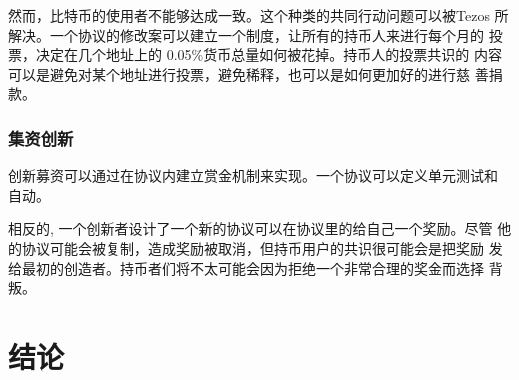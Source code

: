 \documentclass[letterpaper]{article}
\begin{document}
然而，比特币的使用者不能够达成一致。这个种类的共同行动问题可以被Tezos
所解决。一个协议的修改案可以建立一个制度，让所有的持币人来进行每个月的
投票，决定在几个地址上的 0.05\%货币总量如何被花掉。持币人的投票共识的
内容可以是避免对某个地址进行投票，避免稀释，也可以是如何更加好的进行慈
善捐款。

\subsubsection{集资创新}

创新募资可以通过在协议内建立赏金机制来实现。一个协议可以定义单元测试和
自动。

相反的, 一个创新者设计了一个新的协议可以在协议里的给自己一个奖励。尽管
他的协议可能会被复制，造成奖励被取消，但持币用户的共识很可能会是把奖励
发给最初的创造者。持币者们将不太可能会因为拒绝一个非常合理的奖金而选择
背叛。


\section*{结论}
\end{document}
